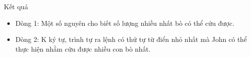 Kết quả
\begin{itemize}
	\item     Dòng 1: Một số nguyên cho biết số lượng nhiều nhất bò có thể cứu được.   
	\item     Dòng 2: K ký tự, trình tự ra lệnh có thứ tự từ điển nhỏ nhất mà John có thể thực hiện nhằm cứu được nhiều con bò nhất.   
\end{itemize}